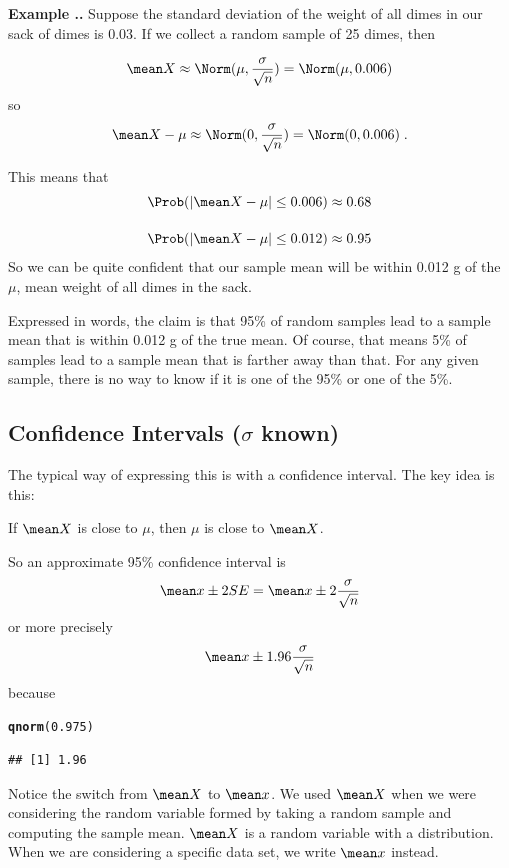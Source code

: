 \documentclass[twoside]{book}\usepackage[]{graphicx}\usepackage[]{xcolor}
\makeatletter
\newcommand{\hlnum}[1]{\textcolor[rgb]{0.686,0.059,0.569}{#1}}%
\newcommand{\hlstd}[1]{\textcolor[rgb]{0.345,0.345,0.345}{#1}}%
\newcommand{\hlkwd}[1]{\textcolor[rgb]{0.737,0.353,0.396}{\textbf{#1}}}%
\newenvironment{kframe}{%
 \def\at@end@of@kframe{}%
 \ifinner\ifhmode%
  \def\at@end@of@kframe{\end{minipage}}%
  \begin{minipage}{\columnwidth}%
 \fi\fi%
 \def\FrameCommand##1{\hskip\@totalleftmargin \hskip-\fboxsep
 \colorbox{shadecolor}{##1}\hskip-\fboxsep
     \hskip-\linewidth \hskip-\@totalleftmargin \hskip\columnwidth}%
 \MakeFramed {\advance\hsize-\width
   \@totalleftmargin\z@ \linewidth\hsize
   \@setminipage}}%
 {\par\unskip\endMakeFramed%
 \at@end@of@kframe}
\newenvironment{knitrout}{}{} %
\newcounter{example}[section]
\newenvironment{example}%
{\refstepcounter{example}%
\textbf{Example \thesection.\arabic{example}. }}%
{}
\makeatother
\begin{document}
\begin{example}
	Suppose the standard deviation of the weight of all dimes in our sack of dimes is $0.03$.
	If we collect a random sample of 25 dimes, then 

	\[
	\mean X \approx \Norm(\mu, \frac{\sigma}{\sqrt{n}}) = \Norm(\mu, 0.006)
	\]
	so 
	\[
	\mean X - \mu  \approx \Norm(0, \frac{\sigma}{\sqrt{n}}) = \Norm(0, 0.006) \;.
	\]

	This means that
	\begin{align*}
	\Prob(| \mean X - \mu | \le 0.006) &\approx 0.68
	\\[4mm]
	\Prob(| \mean X - \mu | \le 0.012) &\approx 0.95
\end{align*}
So we can be quite confident that our sample mean will be within 0.012 g of the $\mu$,
mean weight of all dimes in the sack.

Expressed in words, the claim is that 95\% of random samples lead to a sample mean
that is within 0.012 g of the true mean.  Of course, that means 5\% of samples lead
to a sample mean that is farther away than that.  For any given sample, there is 
no way to know if it is one of the 95\% or one of the 5\%.
\end{example}


\subsection{Confidence Intervals ($\sigma$ known)}

The typical way of expressing this is with a confidence interval.  The key idea 
is this:

\begin{center}
If $\mean X$ is close to $\mu$, then $\mu$ is close to $\mean X$.
\end{center}

So an approximate 95\% confidence interval is 
\[
\mean x \pm 2 SE 
= \mean x \pm 2 \frac{\sigma}{\sqrt{n}}
\]
or more precisely
\[
\mean x \pm 1.96 \frac{\sigma}{\sqrt{n}}
\]
because
\begin{knitrout}
\color{fgcolor}\begin{kframe}
\begin{alltt}
\hlkwd{qnorm}\hlstd{(}\hlnum{0.975}\hlstd{)}
\end{alltt}
\begin{verbatim}
## [1] 1.96
\end{verbatim}
\end{kframe}
\end{knitrout}
Notice the switch from $\mean X$ to $\mean x$.  We used $\mean X$ when we were
considering the random variable formed by taking a random sample and computing
the sample mean.  $\mean X$ is a random variable with a distribution.
When we are considering a specific data set, we write $\mean x$ instead.
\end{document}
